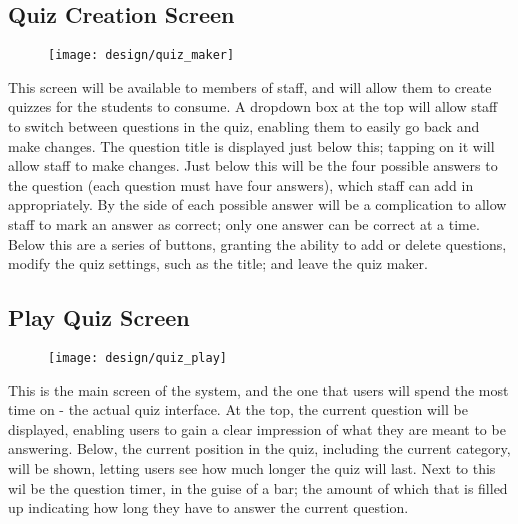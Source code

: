 \clearpage

\subsection{Quiz Creation Screen}
\begin{figure}[h!]
  \texttt{[image: design/quiz\_maker]}
\end{figure}

This screen will be available to members of staff, and will allow them to create quizzes for the students to consume. A dropdown box at the top will allow staff to switch between questions in the quiz, enabling them to easily go back and make changes. The question title is displayed just below this; tapping on it will allow staff to make changes. Just below this will be the four possible answers to the question (each question must have four answers), which staff can add in appropriately. By the side of each possible answer will be a complication to allow staff to mark an answer as correct; only one answer can be correct at a time. Below this are a series of buttons, granting the ability to add or delete questions, modify the quiz settings, such as the title; and leave the quiz maker.

\clearpage

\subsection{Play Quiz Screen}
\begin{figure}[h!]
  \texttt{[image: design/quiz\_play]}
\end{figure}

This is the main screen of the system, and the one that users will spend the most time on - the actual quiz interface. At the top, the current question will be displayed, enabling users to gain a clear impression of what they are meant to be answering. Below, the current position in the quiz, including the current category, will be shown, letting users see how much longer the quiz will last. Next to this wil be the question timer, in the guise of a bar; the amount of which that is filled up indicating how long they have to answer the current question.
